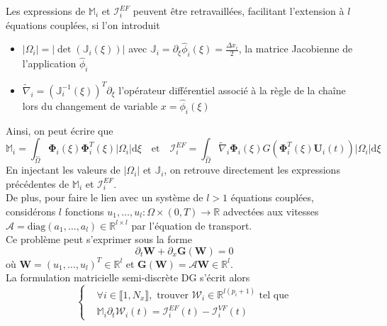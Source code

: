 \documentclass[11pt, a4paper, oneside]{report}
\begin{document}
Les expressions de $\mathbb{M}_i$ et $\bm{\mathcal{I}}_i^{EF}$ peuvent être retravaillées, facilitant l'extension à $l$ équations couplées, si l'on introduit
\begin{itemize}
    \item $\displaystyle \lvert \Omega_i \rvert = \lvert \det (\mathbb{J}_i(\xi)) \rvert$ avec $\displaystyle \mathbb{J}_i = \partial_\xi \widehat{\phi}_i(\xi) = \frac{\Delta x_i}{2}$, la matrice Jacobienne de l'application $\widehat{\phi}_i$
    \item $\displaystyle \widetilde{\nabla}_{i} = \left( \mathbb{J}_i^{-1}(\xi) \right)^T \partial_\xi$ l'opérateur différentiel associé à la règle de la chaîne lors du changement de variable $x = \widehat{\phi}_i(\xi)$
\end{itemize}
Ainsi, on peut écrire que
\begin{equation}
    \mathbb{M}_i = \int_{\widehat{\Omega}} \bm{\Phi}_i(\xi) \bm{\Phi}_i^T(\xi) \lvert \Omega_i \rvert \text{d}\xi \quad \text{et} \quad \bm{\mathcal{I}}_i^{EF} = \int_{\widehat{\Omega}} \widetilde{\nabla}_i \bm{\Phi}_i(\xi) G \left( \bm{\Phi}_i^T(\xi) \bm{U}_i(t) \right) \lvert \Omega_i \rvert \text{d}\xi
\end{equation}
En injectant les valeurs de $\lvert \Omega_i \rvert$ et $\mathbb{J}_i$, on retrouve directement les expressions précédentes de $\mathbb{M}_i$ et $\bm{\mathcal{I}}_i^{EF}$. \\
De plus, pour faire le lien avec un système de $l > 1$ équations couplées, considérons $l$ fonctions $u_1, \dots, u_l : \Omega \times (0, T) \longrightarrow \mathbb{R}$ advectées aux vitesses $\mathcal{A} = \text{diag}(a_1, \dots, a_l) \in \mathbb{R}^{l \times l}$ par l'équation de transport. \\
Ce problème peut s'exprimer sous la forme
\begin{equation}
    \partial_t \bm{W} + \partial_x \bm{G}(\bm{W}) = 0
\end{equation}
où $\bm{W} = (u_1, \dots, u_l)^T \in \mathbb{R}^l$ et $\bm{G}(\bm{W}) = \mathcal{A} \bm{W} \in \mathbb{R}^l$. \\
La formulation matricielle semi-discrète DG s'écrit alors
\begin{equation}
    \left \{
    \begin{aligned}
        &\forall i \in \llbracket 1, N_x \rrbracket, \text{ trouver } \bm{\mathcal{W}}_i \in \mathbb{R}^{l(p_i + 1)} \text{ tel que} \\
        &\mathbb{M}_i \partial_t \bm{\mathcal{W}}_i(t) = \bm{\mathcal{I}}_i^{EF}(t) - \bm{\mathcal{I}}_i^{VF}(t)
    \end{aligned}
    \right .
\end{equation}
\end{document}
